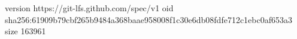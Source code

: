 version https://git-lfs.github.com/spec/v1
oid sha256:61909b79cbf265b9484a368baae958008f1c30e6db08fdfe712c1ebc0af653a3
size 163961
